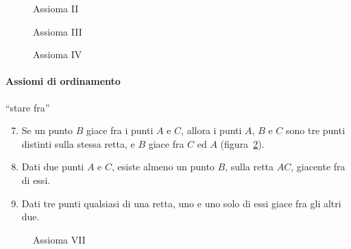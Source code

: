 \begin{inaccessibleblock}
 \begin{figure}[bth]
 \begin{minipage}[b]{.32\textwidth}
 \centering
 
 \caption{Assioma II}\label{fig:1.3}
 \end{minipage}
 \begin{minipage}[b]{.32\textwidth}
 \centering
 
 \caption{Assioma III}\label{fig:1.4}
 \end{minipage}
 \begin{minipage}[b]{.32\textwidth}
 \centering
 
 \caption{Assioma IV}\label{fig:1.5}
 \end{minipage}
\end{figure}
\end{inaccessibleblock}

\paragraph{Assiomi di ordinamento} ``stare fra''
\begin{enumerate}[label=\Roman{*}.]
\setcounter{enumi}{6}
\item Se un punto $B$ giace fra i punti $A$ e $C$, allora i punti 
$A$, $B$ e $C$ sono tre punti distinti sulla stessa retta, e $B$ 
giace fra $C$ ed $A$ (figura~\ref{fig:1.6}).
\item Dati due punti $A$ e $C$, esiste almeno un punto $B$, sulla 
retta $AC$, giacente fra di essi.
\item Dati tre punti qualsiasi di una retta, uno e uno solo di essi 
giace fra gli altri due.
\end{enumerate}


\begin{inaccessibleblock}
 \begin{figure}[htb]
 \centering
 
 \caption{Assioma VII}\label{fig:1.6}
\end{figure}
\end{inaccessibleblock}

